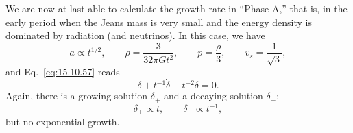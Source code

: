 We are now at last able to calculate the growth rate in ``Phase A,'' that is,
in the early period when the Jeans mass is very small and the energy density
is dominated by radiation (and neutrinos). In this case, we have
\[
  a\propto t^{1/2},
  \qquad
  \rho=\frac3{32\pi Gt^2},
  \qquad
  p=\frac\rho3,
  \qquad
  v_s=\frac1{\sqrt3},
\]
and Eq.~\eqref{eq:15.10.57} reads
\begin{equation}
  \ddot\delta+t^{-1}\dot\delta-t^{-2}\delta=0.
  \tag{15.10.58}\label{eq:15.10.58}
\end{equation}
Again, there is a growing solution \(\delta_+\) and a decaying solution
\(\delta_-\):
\begin{equation}
  \delta_+\propto t,
  \qquad
  \delta_-\propto t^{-1},
  \tag{15.10.59}\label{eq:15.10.59}
\end{equation}
but no exponential growth.
